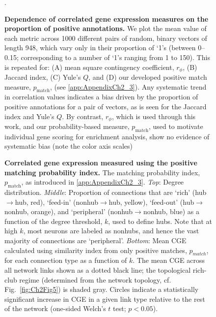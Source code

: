 \begin{figure}[h!]
 \caption{{\bf Dependence of correlated gene expression measures on the proportion of positive annotations.} We plot the mean value of each metric across 1000 different pairs of random, binary vectors of length 948, which vary only in their proportion of `1's (between 0--0.15; corresponding to a number of `1's ranging from 1 to 150).
This is repeated for:
(A) mean square contingency coefficient, $r_\phi$,
(B) Jaccard index,
(C) Yule's $Q$, and
(D) our developed positive match measure, $p_\mathrm{match}$, (see \ref{app:AppendixCh2_3}).
Any systematic trend in correlation values indicates a bias driven by the proportion of positive annotations for a pair of vectors, as is seen for the Jaccard index and Yule's $Q$.
By contrast, $r_\phi$, which is used through this work, and our probability-based measure, $p_\mathrm{match}$, used to motivate individual gene scoring for enrichment analysis, show no evidence of systematic bias (note the color axis scales)}.
\label{fig:Ch2S2_Fig}
\end{figure}


\begin{figure}[h!]
 \caption{{\bf Correlated gene expression measured using the positive matching probability index.} The matching probability index, $p_\mathrm{match}$, as introduced in \ref{app:AppendixCh2_3}. 
\emph{Top}: Degree distribution.
\emph{Middle}: Proportion of connections that are `rich' (hub$\rightarrow$hub, red), `feed-in' (nonhub$\rightarrow$hub, yellow), `feed-out' (hub$\rightarrow$nonhub, orange), and `peripheral' (nonhub$\rightarrow$nonhub, blue) as a function of the degree threshold, $k$, used to define hubs.
Note that at high $k$, most neurons are labeled as nonhubs, and hence the vast majority of connections are `peripheral'.
\emph{Bottom}: Mean CGE calculated using similarity index from only positive matches, $p_{match}$, for each connection type as a function of $k$.
The mean CGE across all network links shown as a dotted black line; the topological rich-club regime (determined from the network topology, cf. Fig.~\ref{fig:Ch2Fig5}) is shaded gray.
Circles indicate a statistically significant increase in CGE in a given link type relative to the rest of the network (one-sided Welch's $t$ test; $p < 0.05$).}
\label{fig:Ch2S3_Fig}
\end{figure}



